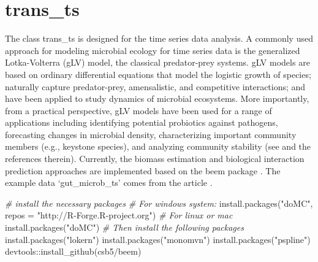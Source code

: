 \documentclass[
]{book}
\newenvironment{Shaded}{\begin{snugshade}}{\end{snugshade}}
\newcommand{\AttributeTok}[1]{\textcolor[rgb]{0.77,0.63,0.00}{#1}}
\newcommand{\CommentTok}[1]{\textcolor[rgb]{0.56,0.35,0.01}{\textit{#1}}}
\newcommand{\FunctionTok}[1]{\textcolor[rgb]{0.00,0.00,0.00}{#1}}
\newcommand{\NormalTok}[1]{#1}
\newcommand{\SpecialCharTok}[1]{\textcolor[rgb]{0.00,0.00,0.00}{#1}}
\newcommand{\StringTok}[1]{\textcolor[rgb]{0.31,0.60,0.02}{#1}}
\begin{document}
\hypertarget{trans_ts}{%
\section{trans\_ts}\label{trans_ts}}

The class trans\_ts is designed for the time series data analysis.
A commonly used approach for modeling microbial ecology for time series data is the generalized Lotka-Volterra (gLV) model, the classical predator-prey systems.
gLV models are based on ordinary differential equations that model the logistic growth of species;
naturally capture predator-prey, amensalistic, and competitive interactions; and have been applied to study dynamics of microbial ecosystems.
More importantly, from a practical perspective, gLV models have been used for a range of applications including identifying potential probiotics
against pathogens, forecasting changes in microbial density, characterizing important community members (e.g., keystone species),
and analyzing community stability (see \citep{Li_expectation_2019} and the references therein).
Currently, the biomass estimation and biological interaction prediction approaches are implemented based on the beem package \citep{Li_expectation_2019}.
The example data `gut\_microb\_ts' comes from the article \citep{Gibbons_twodynamic_2017}.

\begin{Shaded}
\begin{Highlighting}[]
\CommentTok{\# install the necessary packages}
\CommentTok{\# For windows system:}
\FunctionTok{install.packages}\NormalTok{(}\StringTok{"doMC"}\NormalTok{, }\AttributeTok{repos =} \StringTok{"http://R{-}Forge.R{-}project.org"}\NormalTok{)}
\CommentTok{\# For linux or mac}
\FunctionTok{install.packages}\NormalTok{(}\StringTok{"doMC"}\NormalTok{)}
\CommentTok{\# Then install the following packages}
\FunctionTok{install.packages}\NormalTok{(}\StringTok{"lokern"}\NormalTok{)}
\FunctionTok{install.packages}\NormalTok{(}\StringTok{"monomvn"}\NormalTok{)}
\FunctionTok{install.packages}\NormalTok{(}\StringTok{"pspline"}\NormalTok{)}
\NormalTok{devtools}\SpecialCharTok{::}\FunctionTok{install\_github}\NormalTok{(}\StringTok{\textquotesingle{}csb5/beem\textquotesingle{}}\NormalTok{)}
\end{Highlighting}
\end{Shaded}
\end{document}
